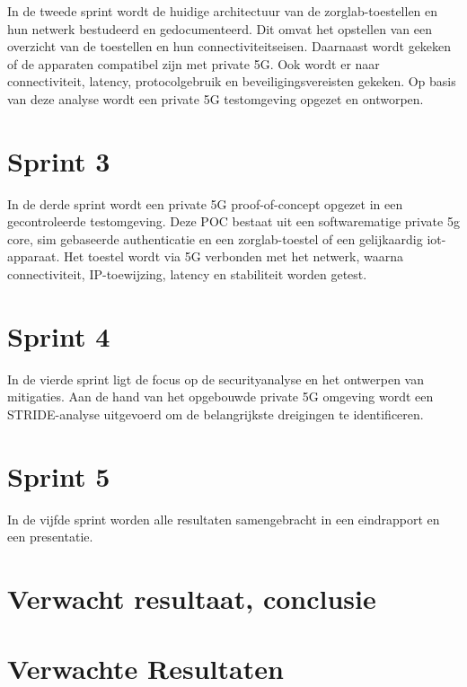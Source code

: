 In de tweede sprint wordt de huidige architectuur van de zorglab-toestellen en hun netwerk bestudeerd en gedocumenteerd. Dit omvat het opstellen van een overzicht van de toestellen en hun connectiviteitseisen. Daarnaast wordt gekeken of de apparaten compatibel zijn met private 5G. Ook wordt er naar connectiviteit, latency, protocolgebruik en beveiligingsvereisten gekeken. Op basis van deze analyse wordt een private 5G testomgeving opgezet en ontworpen.

\section*{Sprint 3}

In de derde sprint wordt een private 5G proof-of-concept opgezet
in een gecontroleerde testomgeving. Deze POC bestaat uit een softwarematige private 5g core, sim gebaseerde authenticatie en een zorglab-toestel of een gelijkaardig iot-apparaat. Het toestel wordt via 5G verbonden met het netwerk, waarna connectiviteit, IP-toewijzing, latency en stabiliteit worden getest.

\section*{Sprint 4}

In de vierde sprint ligt de focus op de securityanalyse en het ontwerpen van mitigaties. Aan de hand van het opgebouwde private 5G omgeving wordt een STRIDE-analyse uitgevoerd om de belangrijkste dreigingen te identificeren.

\section*{Sprint 5}

In de vijfde sprint worden alle resultaten samengebracht in een eindrapport en een presentatie.


\section{Verwacht resultaat, conclusie}%
\label{sec:verwachte_resultaten}

\section*{Verwachte Resultaten}

